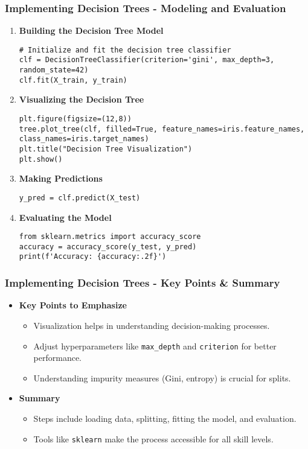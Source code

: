 \documentclass{beamer}
\begin{document}
\begin{frame}[fragile]
    \frametitle{Implementing Decision Trees - Modeling and Evaluation}
    \begin{enumerate}[resume]
        \item \textbf{Building the Decision Tree Model}
            \begin{lstlisting}
# Initialize and fit the decision tree classifier
clf = DecisionTreeClassifier(criterion='gini', max_depth=3, random_state=42)
clf.fit(X_train, y_train)
            \end{lstlisting}

        \item \textbf{Visualizing the Decision Tree}
            \begin{lstlisting}
plt.figure(figsize=(12,8))
tree.plot_tree(clf, filled=True, feature_names=iris.feature_names, class_names=iris.target_names)
plt.title("Decision Tree Visualization")
plt.show()
            \end{lstlisting}

        \item \textbf{Making Predictions}
            \begin{lstlisting}
y_pred = clf.predict(X_test)
            \end{lstlisting}

        \item \textbf{Evaluating the Model}
            \begin{lstlisting}
from sklearn.metrics import accuracy_score
accuracy = accuracy_score(y_test, y_pred)
print(f'Accuracy: {accuracy:.2f}')
            \end{lstlisting}
    \end{enumerate}
\end{frame}

\begin{frame}[fragile]
    \frametitle{Implementing Decision Trees - Key Points & Summary}
    \begin{itemize}
        \item \textbf{Key Points to Emphasize}
        \begin{itemize}
            \item Visualization helps in understanding decision-making processes.
            \item Adjust hyperparameters like \texttt{max\_depth} and \texttt{criterion} for better performance.
            \item Understanding impurity measures (Gini, entropy) is crucial for splits.
        \end{itemize}
        
        \item \textbf{Summary}
        \begin{itemize}
            \item Steps include loading data, splitting, fitting the model, and evaluation.
            \item Tools like \texttt{sklearn} make the process accessible for all skill levels.
        \end{itemize}
    \end{itemize}
\end{frame}
\end{document}
